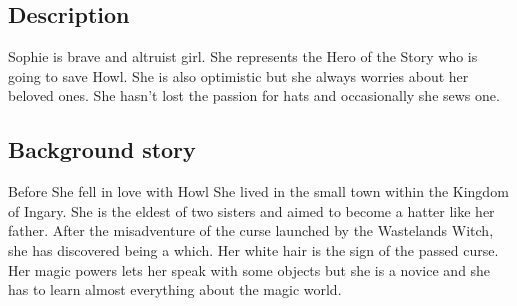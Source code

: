 \begin{figure}
\centering
\end{figure}

\subsection{Description}
Sophie is brave and altruist girl. She represents the Hero of the Story who is going to save Howl. She is also optimistic but she always worries about her beloved ones. She hasn’t lost the passion for hats and occasionally she sews one.

\subsection{Background story}
Before She fell in love with Howl She lived in the small town within the Kingdom of Ingary. She is the eldest of two sisters and aimed to become a hatter like her father. After the misadventure of the curse launched by the Wastelands Witch, she has discovered being a which. Her white hair is the sign of the passed curse. Her magic powers lets her speak with some objects but she is a novice and she has to learn almost everything about the magic world.

